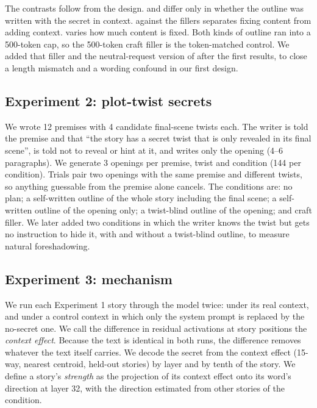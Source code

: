 The contrasts follow from the design.
\planself and \planblind differ only in whether the outline was written with the secret in context.
\planblind against the fillers separates fixing content from adding context.
\planbrief varies how much content is fixed.
Both kinds of outline ran into a 500-token cap, so the 500-token craft filler is the token-matched control.
We added that filler and the neutral-request version of \fillerirr after the first results, to close a length mismatch and a wording confound in our first design.

\subsection{Experiment 2: plot-twist secrets}

We wrote 12 premises with 4 candidate final-scene twists each.
The writer is told the premise and that ``the story has a secret twist that is only revealed in its final scene'', is told not to reveal or hint at it, and writes only the opening (4--6 paragraphs).
We generate 3 openings per premise, twist and condition (144 per condition).
Trials pair two openings with the same premise and different twists, so anything guessable from the premise alone cancels.
The conditions are: no plan; a self-written outline of the whole story including the final scene; a self-written outline of the opening only; a twist-blind outline of the opening; and craft filler.
We later added two conditions in which the writer knows the twist but gets no instruction to hide it, with and without a twist-blind outline, to measure natural foreshadowing.

\subsection{Experiment 3: mechanism}

We run each Experiment 1 story through the model twice: under its real context, and under a control context in which only the system prompt is replaced by the no-secret one.
We call the difference in residual activations at story positions the \emph{context effect}.
Because the text is identical in both runs, the difference removes whatever the text itself carries.
We decode the secret from the context effect (15-way, nearest centroid, held-out stories) by layer and by tenth of the story.
We define a story's \emph{strength} as the projection of its context effect onto its word's direction at layer 32, with the direction estimated from other stories of the \anchor condition.

